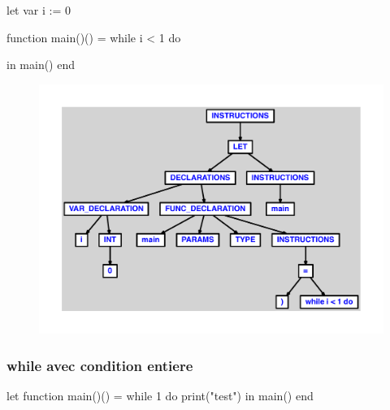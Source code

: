 \documentclass{article}
\begin{document}
\begin{verbatimtab}
let
	var i := 0

	function main()() =
		while i < 1 do

in main() end
\end{verbatimtab}
\begin{figure}[H]\centering\includegraphics[max width=\textwidth]{ast/ast_325.pdf}\end{figure}\subsubsection{while avec condition entiere}
\begin{verbatimtab}
let
	function main()() =
		while 1 do
			print("test")
in main() end
\end{verbatimtab}
\end{document}
